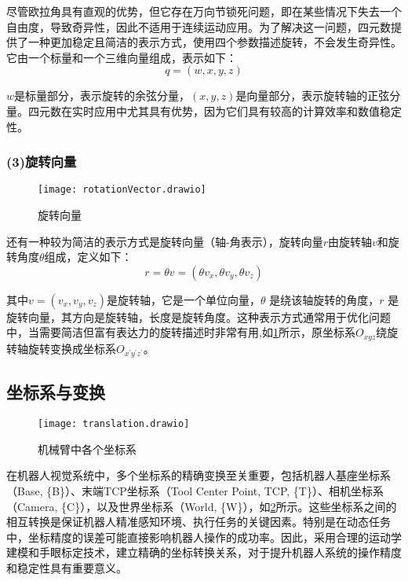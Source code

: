 尽管欧拉角具有直观的优势，但它存在万向节锁死问题，即在某些情况下失去一个自由度，导致奇异性，因此不适用于连续运动应用。为了解决这一问题，四元数提供了一种更加稳定且简洁的表示方式，使用四个参数描述旋转，不会发生奇异性。它由一个标量和一个三维向量组成，表示如下：
\begin{equation}
	\label{equ:Quaternion}
	q=(w,x,y,z)
\end{equation}

$w$是标量部分，表示旋转的余弦分量，$(x,y,z)$是向量部分，表示旋转轴的正弦分量。四元数在实时应用中尤其具有优势，因为它们具有较高的计算效率和数值稳定性。

 \subsubsection*{(3)旋转向量}
 
  \begin{figure}[htbp]
 	\texttt{[image: rotationVector.drawio]}
 	\caption[旋转向量]{旋转向量} %
 	\label{fig: rotationVector.drawio}
 \end{figure}
还有一种较为简洁的表示方式是旋转向量（轴-角表示），旋转向量$r$由旋转轴$v$和旋转角度$\theta$组成，定义如下：
\begin{equation}
	\label{equ:rotationVector}
	r=\theta v=(\theta v_{x},\theta v_{y},\theta v_{z})
\end{equation}

其中$v=(v_{x},v_{y},v_{z})$是旋转轴，它是一个单位向量，$\theta$ 是绕该轴旋转的角度，$r$ 是旋转向量，其方向是旋转轴，长度是旋转角度。这种表示方式通常用于优化问题中，当需要简洁但富有表达力的旋转描述时非常有用,如\cref{fig: rotationVector.drawio}所示，原坐标系$O_{xyz}$绕旋转轴旋转变换成坐标系$O_{x^{\prime}y^{\prime}z^{\prime}}$。


\subsection{坐标系与变换}
 \begin{figure}[htb]
	\texttt{[image: translation.drawio]}
	\caption[机械臂中各个坐标系]{机械臂中各个坐标系} %
	\label{fig:translation.drawio}
\end{figure}

在机器人视觉系统中，多个坐标系的精确变换至关重要，包括机器人基座坐标系（Base, \{B\}）、末端TCP坐标系（Tool Center Point, TCP, \{T\}）、相机坐标系（Camera, \{C\}），以及世界坐标系（World, \{W\}），如\cref{fig:translation.drawio}所示。这些坐标系之间的相互转换是保证机器人精准感知环境、执行任务的关键因素。特别是在动态任务中，坐标精度的误差可能直接影响机器人操作的成功率。因此，采用合理的运动学建模和手眼标定技术，建立精确的坐标转换关系，对于提升机器人系统的操作精度和稳定性具有重要意义。

